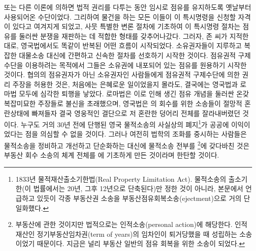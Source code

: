 또는 다른 이론에 의하면
법적 권리를 다투는 동안 임시로 점유를 유지하도록 옛날부터 사용되어온
수단이었다.
그리하여 물건을 
하는 모든 이들이 이 특시명령을 신청할 자격이 있다고
여겨지게 되었고,
사뭇 특별한 변론 절차에 기초하여
이 특시명령 절차는 점유를 둘러싼 분쟁을 재판하는 데 적합한 형태를
갖추어나갔다.
그러자, 존  씨가 지적한대로,
영국법에서도 똑같이 반복된 어떤 흐름이 시작되었다.
소유권자들이
지루하고 복잡한 대물소송 대신에
간편하고 신속한  절차를 선호하기 시작한 것이다.
점유권적 구제수단을 이용하려는 목적에서
그들은 소유권에 내포되어 있는 점유를 원용하기 시작한 것이다.
협의의 점유권자가 아닌 소유권자인 사람들에게
점유권적 구제수단에 의한 권리 주장을 허용한 것은,
처음에는 은혜로운 일이었을지 몰라도,
결국에는 영국법과 로마법 모두에 심각한 퇴행을 낳았다.
로마법은
이로 인해 생긴
점유 개념을 둘러싼 온갖 복잡미묘한 주장들로
불신을 초래했으며,
영국법은
의 회수를 위한 소송들이
절망적 혼란상태에 빠져들자
결국 영웅적인 결단으로
저 혼란한 덩어리 전체를 잘라내버렸던 것이다.
누구도 거의 30년 전에 단행된
영국 물적소송의 사실상의 폐지\footnote{%
  1833년 물적재산출소기한법(Real Property Limitation Act).
  물적소송의 출소기한(이 법률에서는 20년, 그후 12년으로 단축된다)만
  정한 것이 아니라, 본문에서 언급하고 있듯이
  각종 부동산권 소송을 부동산점유회복소송(ejectment)으로 거의 단일화했다.
}가 공공에 이익이었다는 점을 의심할 수 없을 것이다.
그러나 여전히
법학의 조화를 중시하는 사람들은
물적소송을
정비하고 개선하고 단순화하는 대신에
물적소송 전부를 \footnote{%
  부동산에 관한 것이지만 법적으로는 인적소송(personal action)에
  해당한다. 인적재산인 정기부동산임차권(term of years)의 임차인이
  퇴거당했을 때 성립하는 소송이었기 때문이다.
  지금은 널리 부동산 일반의 점유 회복을 위한 소송이 되었다.
}에 갖다바친 것은
부동산 회수 소송의 체계 전체를 에 기초하게 만든 것이라며
한탄할 것이다.

